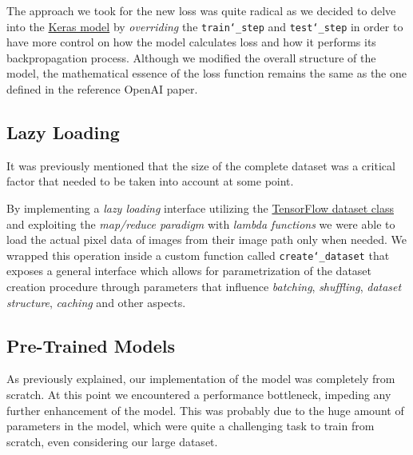 \documentclass[10pt,twocolumn,letterpaper]{article}
\begin{document}
The approach we took for the new loss was quite radical as we decided to delve into the \href{https://www.tensorflow.org/api_docs/python/tf/keras/Model}{Keras model} by \textit{overriding} the \texttt{train\char`_step} and \texttt{test\char`_step} in order to have more control on how the model calculates loss and how it performs its backpropagation process.
Although we modified the overall structure of the model, the mathematical essence of the loss function remains the same as the one defined in the reference OpenAI paper.

\subsection{Lazy Loading}
It was previously mentioned that the size of the complete dataset was a critical factor that needed to be taken into account at some point.

By implementing a \textit{lazy loading} interface utilizing the \href{https://www.tensorflow.org/api_docs/python/tf/data/Dataset}{TensorFlow dataset class} and exploiting the \textit{map/reduce paradigm} with \textit{lambda functions} we were able to load the actual pixel data of images from their image path only when needed.
We wrapped this operation inside a custom function called \texttt{create\char`_dataset} that exposes a general interface which allows for parametrization of the dataset creation procedure through parameters that influence \textit{batching}, \textit{shuffling}, \textit{dataset structure}, \textit{caching} and other aspects.


\subsection{Pre-Trained Models}
As previously explained, our implementation of the model was completely from scratch. At this point we encountered a performance bottleneck, impeding any further enhancement of the model. This was probably due to the huge amount of parameters in the model, which were quite a challenging task to train from scratch, even considering our large dataset.
\end{document}
